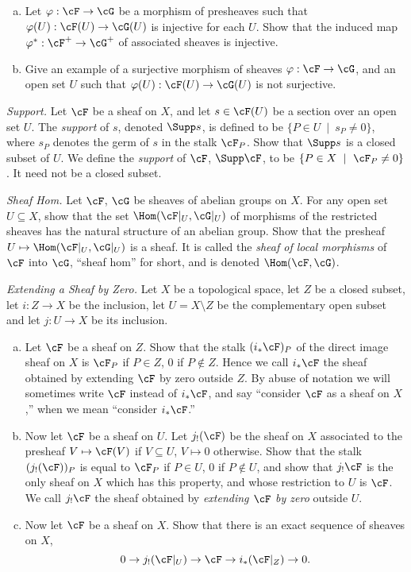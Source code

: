 \begin{homework}[e]
	$ $
	\begin{enumerate}[(a)]

		\item Let $\varphi:\cF\to \cG$ be a morphism of presheaves such that $\varphi(U):\cF(U)\to \cG(U)$ is injective for each $U$. Show that the induced map $\varphi^*:\cF^+\to \cG^+$ of associated sheaves is injective.

		\item Give an example of a surjective morphism of sheaves $\varphi:\cF\to \cG$, and an open set $U$ such that $\varphi(U):\cF(U)\to \cG(U)$ is not surjective. 
	\end{enumerate}

	 \textit{Support.} Let $\cF$ be a sheaf on $X$, and let $s \in \cF(U)$ be a section over an open set $U$. The \textit{support} of $s$, denoted $\Supp s$, is defined to be $\{P\in U ~ \mid~ s_P \neq 0\}$, where $s_P$ denotes the germ of $s$ in the stalk $\cF_P$. Show that $\Supp s$ is a closed subset of $U$. We define the \textit{support} of $\cF$, $\Supp \cF$, to be $\{P\in X~\mid~ \cF_P \neq 0\}$. It need not be a closed subset.

	 \textit{Sheaf Hom.} Let $\cF$, $\cG$ be sheaves of abelian groups on $X$. For any open set $U \subseteq X$, show that the set $\Hom(\cF|_U, \cG|_U)$ of morphisms of the restricted sheaves has the natural structure of an abelian group. Show that the presheaf $U \mapsto \Hom(\cF|_U, \cG|_U)$ is a sheaf. It is called the \textit{sheaf of local morphisms} of $\cF$ into $\cG$, ``sheaf hom'' for short, and is denoted $\Hom(\cF, \cG)$.

	 \textit{Extending a Sheaf by Zero.} Let $X$ be a topological space, let $Z$ be a closed subset, let $i:Z\to X$ be the inclusion, let $U = X \setminus Z$ be the complementary open subset and let $j:U\to X$ be its inclusion.
	\begin{enumerate}[(a)]
		\item Let $\cF$ be a sheaf on $Z$. Show that the stalk $(i_*\cF)_P$ of the direct image sheaf on  $X$ is $\cF_P$ if $P \in Z$, $0$ if $P \not\in Z$. Hence we call $i_* \cF$ the sheaf obtained by extending $\cF$ by zero outside $Z$. By abuse of notation we will sometimes write $\cF$ instead of $i_*\cF$, and say ``consider $\cF$ as a sheaf on $X$,'' when we mean ``consider $i_*\cF$.''
		\item Now let $\cF$ be a sheaf on $U$. Let $j_!(\cF)$ be the sheaf on $X$ associated to the presheaf $V\mapsto \cF(V)$ if $V \subseteq U$, $V \mapsto 0$ otherwise. Show that the stalk $(j_!(\cF))_P$ is equal to $\cF_P$ if $P \in U$, 0 if $P \not\in U$, and show that $j_!\cF$ is the only sheaf on $X$ which has this property, and whose restriction to $U$ is $\cF$. We call $j_!\cF$ the sheaf obtained by \textit{extending $\cF$ by zero} outside $U$. 
		\item Now let  $\cF$ be a sheaf on $X$. Show that there is an exact sequence of sheaves on $X$,
			\[
			0 \to j_!(\cF|_U) \to \cF \to i_*(\cF|_Z) \to 0.
			\]
	\end{enumerate}


\end{homework}
